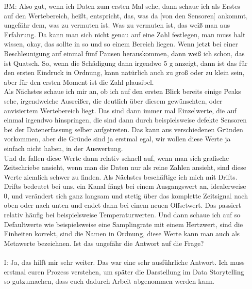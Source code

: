 \begin{linenumbers}
BM: Also gut, wenn ich Daten zum ersten Mal sehe, dann schaue ich als Erstes auf den Wertebereich, heißt, entspricht, das, was da [von den Sensoren] ankommt, ungefähr dem, was zu vermuten ist. Was zu vermuten ist, das weiß man aus Erfahrung. Da kann man sich nicht genau auf eine Zahl festlegen, man muss halt wissen, okay, das sollte in so und so einem Bereich liegen. Wenn jetzt bei einer Beschleunigung auf einmal fünf Pausen herauskommen, dann weiß ich schon, das ist Quatsch. So, wenn die Schädigung dann irgendwo 5 g anzeigt, dann ist das für den ersten Eindruck in Ordnung, kann natürlich auch zu groß oder zu klein sein, aber für den ersten Moment ist die Zahl plausibel.\\ Als Nächstes schaue ich mir an, ob ich auf den ersten Blick bereits einige Peaks sehe, irgendwelche Ausreißer, die deutlich über diesem gewünschten, oder anvisiertem Wertebereich liegt. Das sind dann immer mal Einzelwerte, die auf einmal irgendwo hinspringen, die sind dann durch beispielsweise defekte Sensoren bei der Datenerfassung selber aufgetreten. Das kann aus verschiedenen Gründen vorkommen, aber die Gründe sind ja erstmal egal, wir wollen diese Werte ja einfach nicht haben, in der Auswertung.\\ Und da fallen diese Werte dann relativ schnell auf, wenn man sich grafische Zeitschriebe ansieht, wenn man die Daten nur als reine Zahlen ansieht, sind diese Werte ziemlich schwer zu finden. Als Nächstes beschäftige ich mich mit Drifts. Drifts bedeutet bei uns, ein Kanal fängt bei einem Ausgangswert an, idealerweise 0, und verändert sich ganz langsam und stetig über das komplette Zeitsignal nach oben oder nach unten und endet dann bei einem neuen Offsetwert. Das passiert relativ häufig bei beispielsweise Temperaturwerten. Und dann schaue ich auf so Defaultwerte wie beispielsweise eine Samplingrate mit einem Hertzwert, sind die Einheiten korrekt, sind die Namen in Ordnung, diese Werte kann man auch als Metawerte bezeichnen. Ist das ungefähr die Antwort auf die Frage?\\\\
I: Ja, das hilft mir sehr weiter. Das war eine sehr ausführliche Antwort. Ich muss erstmal euren Prozess verstehen, um später die Darstellung im Data Storytelling so gutzumachen, dass euch dadurch Arbeit abgenommen werden kann.\\\\

\end{linenumbers}
